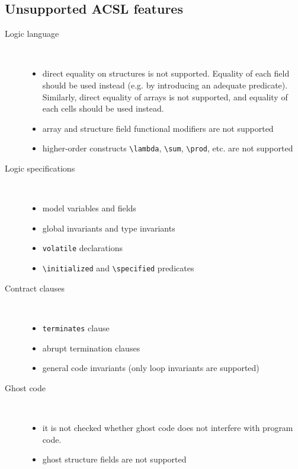 \documentclass[a4paper,11pt,twoside,openright]{report}
\begin{document}
\subsection{Unsupported ACSL features}

\begin{description}
\item[Logic language] ~\\
  \begin{itemize}
  \item direct equality on structures is not supported. Equality of
    each field should be used instead (e.g. by introducing an adequate
    predicate). Similarly, direct equality of arrays is not supported,
    and equality of each cells should be used instead.
  \item array and structure field functional modifiers are not supported
  \item higher-order constructs \verb|\lambda|, \verb|\sum|,
    \verb|\prod|, etc. are not supported
  \end{itemize}
\item[Logic specifications] ~\\
  \begin{itemize}
  \item model variables and fields
  \item global invariants and type invariants
  \item \verb|volatile| declarations
  \item \verb|\initialized| and \verb|\specified| predicates
  \end{itemize}
\item[Contract clauses] ~\\
  \begin{itemize}
  \item \texttt{terminates} clause
  \item abrupt termination clauses
  \item general code invariants (only loop invariants are supported)
  \end{itemize}
\item[Ghost code] ~\\
  \begin{itemize}
  \item it is not checked whether ghost code does not interfere with
    program code.
  \item ghost structure fields are not supported
  \end{itemize}

\end{description}
\end{document}
